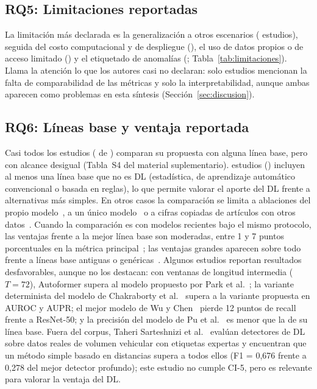\documentclass[12pt, a4paper]{article}
\begin{document}


\subsection{RQ5: Limitaciones reportadas}

La limitación más declarada es la generalización a otros escenarios (\Nlimgeneralizacion{} estudios), seguida del costo computacional y de despliegue (\Nlimcostodespliegue), el uso de datos propios o de acceso limitado (\Nlimdatosreplicabilidad) y el etiquetado de anomalías (\Nlimetiquetado; Tabla~\ref{tab:limitaciones}). Llama la atención lo que los autores casi no declaran: solo \Nlimmetricasnouniformes{} estudios mencionan la falta de comparabilidad de las métricas y solo \Nliminterpretabilidad{} la interpretabilidad, aunque ambas aparecen como problemas en esta síntesis (Sección~\ref{sec:discusion}).



\subsection{RQ6: Líneas base y ventaja reportada}
\label{sec:rq6}

Casi todos los estudios (\Nbaselines{} de \Nestudios) comparan su propuesta con alguna línea base, pero con alcance desigual (Tabla~S4 del material suplementario). \NbaselineNoDL{} estudios (\PTodosNoDL) incluyen al menos una línea base que no es DL (estadística, de aprendizaje automático convencional o basada en reglas), lo que permite valorar el aporte del DL frente a alternativas más simples. En otros casos la comparación se limita a ablaciones del propio modelo~\cite{seghir2026real}, a un único modelo~\cite{jia2020long} o a cifras copiadas de artículos con otros datos~\cite{jadhav2026multistage,chauhan2026cvae}. Cuando la comparación es con modelos recientes bajo el mismo protocolo, las ventajas frente a la mejor línea base son moderadas, entre 1 y 7 puntos porcentuales en la métrica principal~\cite{fang2020deep,biswas2025mmvad,onsu2025intelligent,wu2026feasibility,chai2026road,nouri2026early}; las ventajas grandes aparecen sobre todo frente a líneas base antiguas o genéricas~\cite{htun2023tempolearn,guan2025domain}. Algunos estudios reportan resultados desfavorables, aunque no los destacan: con ventanas de longitud intermedia ($T=72$), Autoformer supera al modelo propuesto por Park et al.~\cite{park2025graph}; la variante determinista del modelo de Chakraborty et al.~\cite{chakraborty2023structural} supera a la variante propuesta en AUROC y AUPR; el mejor modelo de Wu y Chen~\cite{wu2026feasibility} pierde 12 puntos de recall frente a ResNet-50; y la precisión del modelo de Pu et al.~\cite{pu2026swencoder} es menor que la de su línea base. Fuera del corpus, Taheri Sarteshnizi et al.~\cite{taheri2026applicability} evalúan detectores de DL sobre datos reales de volumen vehicular con etiquetas expertas y encuentran que un método simple basado en distancias supera a todos ellos (F1 = 0,676 frente a 0,278 del mejor detector profundo); este estudio no cumple CI-5, pero es relevante para valorar la ventaja del DL.
\end{document}
